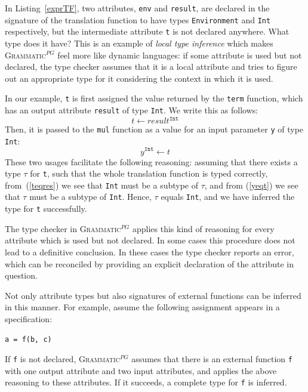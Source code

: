 \documentclass{informat} %
\newcommand{\lstref}[1]{Listing~\ref{#1}}
\newcommand{\ATF}{\textsc{Grammatic}$^{PG}$}
\begin{document}
In \lstref{exprTF}, two attributes, \texttt{env} and \texttt{result}, are declared in the signature of the translation function to have types \texttt{Environment} and \texttt{Int} respectively, but the intermediate attribute \texttt{t} is not declared anywhere. What type does it have? This is an example of \emph{local type inference} which makes \ATF{} feel more like dynamic languages: if some attribute is used but not declared, the type checker assumes that it is a local attribute and tries to figure out an appropriate type for it considering the context in which it is used. 

In our example,  \texttt{t} is first assigned the value returned by the \texttt{term} function, which has an output attribute \texttt{result} of type \texttt{Int}. We write this as follows:
\begin{equation}\label{teqres}
		t \leftarrow result^{\mathtt{Int}}
\end{equation}
Then, it is passed to the \texttt{mul} function as a value for an input parameter \texttt{y} of type \texttt{Int}:
\begin{equation}\label{yeqt}
		y^{\mathtt{Int}} \leftarrow t
\end{equation}
These two usages facilitate the following reasoning: assuming that there exists a type $\tau$ for \texttt{t}, such that the whole translation function is typed correctly, from~(\ref{teqres}) we see that \texttt{Int} must be a subtype of $\tau$, and from (\ref{yeqt})  we see that $\tau$ must be a subtype of \texttt{Int}. Hence, $\tau$ equals \texttt{Int}, and we have inferred the type for \texttt{t} successfully. 

The type checker in \ATF{} applies this kind of reasoning for every attribute which is used but not declared. In some cases this procedure does not lead to a definitive conclusion. In these cases the type checker reports an error, which can be reconciled by providing an explicit declaration of the attribute in question. 

Not only attribute types but also signatures of external functions can be inferred in this manner. For example, assume the following assignment appears in a specification:
\begin{lstlisting}
a = f(b, c)
\end{lstlisting}
If \texttt{f} is not declared, \ATF{} assumes that there is an external function \texttt{f} with one output attribute and two input attributes, and applies the above reasoning to these attributes. If it succeeds, a complete type for \texttt{f} is inferred.
\end{document}
